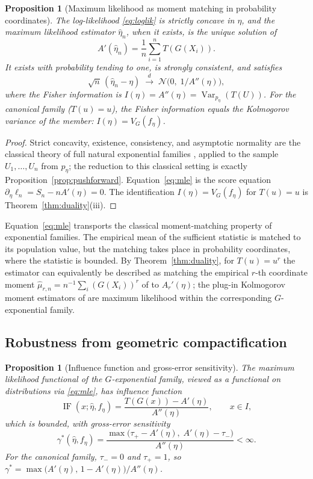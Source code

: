 \documentclass[11pt]{article}
\newtheorem{proposition}[theorem]{Proposition}
\theoremstyle{definition}
\newcommand{\Var}{\operatorname{Var}}
\newcommand{\IF}{\operatorname{IF}}
\begin{document}
\begin{proposition}[Maximum likelihood as moment matching in probability
coordinates]\label{prop:mle}
The log-likelihood \eqref{eq:loglik} is strictly concave in $\eta$, and
the maximum likelihood estimator $\hat\eta_n$, when it exists, is the
unique solution of
\begin{equation}\label{eq:mle}
A'(\hat\eta_n)=\frac1n\sum_{i=1}^n T(G(X_i)).
\end{equation}
It exists with probability tending to one, is strongly consistent, and
satisfies
\[
\sqrt n\,(\hat\eta_n-\eta)
\;\xrightarrow{d}\;
\mathcal N\!\bigl(0,\;1/A''(\eta)\bigr),
\]
where the Fisher information is
$I(\eta)=A''(\eta)=\Var_{p_\eta}(T(U))$. For the canonical family
($T(u)=u$), the Fisher information equals the Kolmogorov variance of the
member: $I(\eta)=V_G(f_\eta)$.
\end{proposition}

\begin{proof}
Strict concavity, existence, consistency, and asymptotic normality are the
classical theory of full natural exponential families
\cite{Brown1986,vanderVaart1998}, applied to the sample $U_1,\dots,U_n$
from $p_\eta$; the reduction to this classical setting is exactly
Proposition~\ref{prop:pushforward}. Equation~\eqref{eq:mle} is the score
equation $\partial_\eta\ell_n=S_n-nA'(\eta)=0$. The identification
$I(\eta)=V_G(f_\eta)$ for $T(u)=u$ is Theorem~\ref{thm:duality}(iii).
\end{proof}

Equation~\eqref{eq:mle} transports the classical moment-matching property
of exponential families. The empirical mean of
the sufficient statistic is matched to its population value, but the
matching takes place in probability coordinates, where the statistic is
bounded. By Theorem~\ref{thm:duality}, for $T(u)=u^r$ the estimator can
equivalently be described as matching the empirical $r$-th coordinate moment
$\widehat\mu_{r,n}=n^{-1}\sum_i(G(X_i))^r$ of \cite{Cojocea2026b} to
$A_r'(\eta)$; the plug-in Kolmogorov moment
estimators of \cite{Cojocea2026b} are maximum likelihood within the
corresponding $G$-exponential family.

\subsection{Robustness from geometric compactification}

\begin{proposition}[Influence function and gross-error sensitivity]
\label{prop:IF}
The maximum likelihood functional of the $G$-exponential family, viewed as
a functional on distributions via \eqref{eq:mle}, has influence function
\[
\IF(x;\hat\eta,f_\eta)
=\frac{T(G(x))-A'(\eta)}{A''(\eta)},
\qquad x\in I,
\]
which is bounded, with gross-error sensitivity
\[
\gamma^*(\hat\eta,f_\eta)
=\frac{\max\bigl(\tau_+-A'(\eta),\;A'(\eta)-\tau_-\bigr)}{A''(\eta)}
<\infty .
\]
For the canonical family, $\tau_-=0$ and $\tau_+=1$, so
$\gamma^*=\max\bigl(A'(\eta),\,1-A'(\eta)\bigr)/A''(\eta)$.
\end{proposition}
\end{document}
